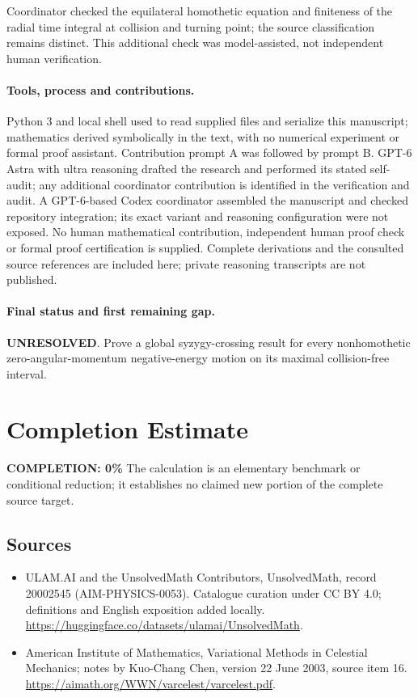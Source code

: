 \documentclass[11pt]{article}
\begin{document}
Coordinator checked the equilateral homothetic equation and finiteness of the radial time integral at collision and turning point; the source classification remains distinct. This additional check was model-assisted, not independent human verification.

\paragraph{Tools, process and contributions.}
Python 3 and local shell used to read supplied files and serialize this manuscript; mathematics derived symbolically in the text, with no numerical experiment or formal proof assistant. Contribution prompt A was followed by prompt B. GPT-6 Astra with ultra reasoning drafted the research and performed its stated self-audit; any additional coordinator contribution is identified in the verification and audit. A GPT-6-based Codex coordinator assembled the manuscript and checked repository integration; its exact variant and reasoning configuration were not exposed. No human mathematical contribution, independent human proof check or formal proof certification is supplied. Complete derivations and the consulted source references are included here; private reasoning transcripts are not published.

\paragraph{Final status and first remaining gap.}
\textbf{UNRESOLVED}. Prove a global syzygy-crossing result for every nonhomothetic zero-angular-momentum negative-energy motion on its maximal collision-free interval.

\section{Completion Estimate}
\noindent\textbf{COMPLETION: 0\%}
The calculation is an elementary benchmark or conditional reduction; it establishes no claimed new portion of the complete source target.

\subsection{Sources}
\begin{itemize}
\item[\hypertarget{source:20002545:1}{S1}] ULAM.AI and the UnsolvedMath Contributors, UnsolvedMath, record 20002545 (AIM-PHYSICS-0053). Catalogue curation under CC BY 4.0; definitions and English exposition added locally.
\url{https://huggingface.co/datasets/ulamai/UnsolvedMath}.
\item[\hypertarget{source:20002545:2}{S2}] American Institute of Mathematics, Variational Methods in Celestial Mechanics; notes by Kuo-Chang Chen, version 22 June 2003, source item 16.
\url{https://aimath.org/WWN/varcelest/varcelest.pdf}.
\end{itemize}
\label{end:20002545}
\end{document}
